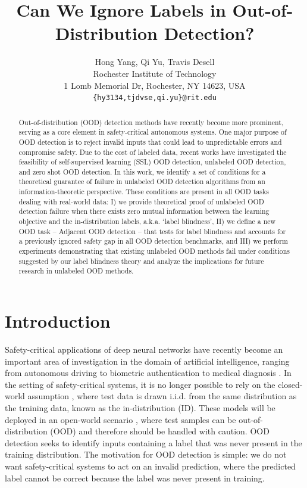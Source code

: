 \documentclass{article} %
\title{Can We Ignore Labels in Out-of-Distribution Detection?}
\author{Hong Yang, Qi Yu, Travis Desell \\
Rochester Institute of Technology\\
1 Lomb Memorial Dr, Rochester, NY 14623, USA \\
\texttt{\{hy3134,tjdvse,qi.yu\}@rit.edu} \\
}
\theoremstyle{plain}
\theoremstyle{definition}
\theoremstyle{remark}
\begin{document}
\maketitle

\begin{abstract}
    Out-of-distribution (OOD) detection methods have recently become more prominent, serving as a core element in safety-critical autonomous systems. One major purpose of OOD detection is to reject invalid inputs that could lead to unpredictable errors and compromise safety. Due to the cost of labeled data, recent works have investigated the feasibility of self-supervised learning (SSL) OOD detection, unlabeled OOD detection, and zero shot OOD detection. In this work, we identify a set of conditions for a theoretical guarantee of failure in unlabeled OOD detection algorithms from an information-theoretic perspective. These conditions are present in all OOD tasks dealing with real-world data: 
    I) we provide theoretical proof of unlabeled OOD detection failure when there exists zero mutual information between the learning objective and the in-distribution labels, a.k.a. `label blindness', 
    II) we define a new OOD task -- Adjacent OOD detection -- that tests for label blindness and accounts for a previously ignored safety gap in all OOD detection benchmarks, and
    III) we perform experiments demonstrating that existing unlabeled OOD methods fail under conditions suggested by our label blindness theory and analyze the implications for future research in unlabeled OOD methods.
\end{abstract}

\vspace{-2mm}\section{Introduction}\vspace{-2mm}

Safety-critical applications of deep neural networks have recently become an important area of investigation in the domain of artificial intelligence, ranging from autonomous driving \citep{ramanagopal2018failing} to biometric authentication \citep{wang2021deep} to medical diagnosis \citep{bakator2018deep}. In the setting of safety-critical systems, it is no longer possible to rely on the closed-world assumption \citep{krizhevsky2012imagenet}, where test data is drawn i.i.d. from the same distribution as the training data, known as the in-distribution (ID). These models will be deployed in an open-world scenario \citep{drummond2006open}, where test samples can be out-of-distribution (OOD) and therefore should be handled with caution. OOD detection seeks to identify inputs containing a label that was never present in the training distribution. The motivation for OOD detection is simple: we do not want safety-critical systems to act on an invalid prediction, where the predicted label cannot be correct because the label was never present in training.
\end{document}
